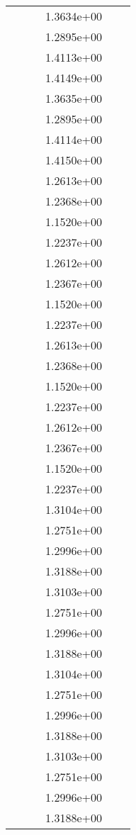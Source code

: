 \begin{xltabular}{\textwidth}{r|rS[table-format=1.3e+2]S[table-format=1.4e+2]S[table-format=1.4e+2]S[table-format=-1.5]}
&  &  & 1.3634e+00 & & \\
&  &  & 1.2895e+00 & & \\
&  &  & 1.4113e+00 & & \\
&  &  & 1.4149e+00 & & \\
&  &  & 1.3635e+00 & & \\
&  &  & 1.2895e+00 & & \\
&  &  & 1.4114e+00 & & \\
&  &  & 1.4150e+00 & & \\
&  &  & 1.2613e+00 & & \\
&  &  & 1.2368e+00 & & \\
&  &  & 1.1520e+00 & & \\
&  &  & 1.2237e+00 & & \\
&  &  & 1.2612e+00 & & \\
&  &  & 1.2367e+00 & & \\
&  &  & 1.1520e+00 & & \\
&  &  & 1.2237e+00 & & \\
&  &  & 1.2613e+00 & & \\
&  &  & 1.2368e+00 & & \\
&  &  & 1.1520e+00 & & \\
&  &  & 1.2237e+00 & & \\
&  &  & 1.2612e+00 & & \\
&  &  & 1.2367e+00 & & \\
&  &  & 1.1520e+00 & & \\
&  &  & 1.2237e+00 & & \\
&  &  & 1.3104e+00 & & \\
&  &  & 1.2751e+00 & & \\
&  &  & 1.2996e+00 & & \\
&  &  & 1.3188e+00 & & \\
&  &  & 1.3103e+00 & & \\
&  &  & 1.2751e+00 & & \\
&  &  & 1.2996e+00 & & \\
&  &  & 1.3188e+00 & & \\
&  &  & 1.3104e+00 & & \\
&  &  & 1.2751e+00 & & \\
&  &  & 1.2996e+00 & & \\
&  &  & 1.3188e+00 & & \\
&  &  & 1.3103e+00 & & \\
&  &  & 1.2751e+00 & & \\
&  &  & 1.2996e+00 & & \\
&  &  & 1.3188e+00 & & \\

\end{xltabular}
